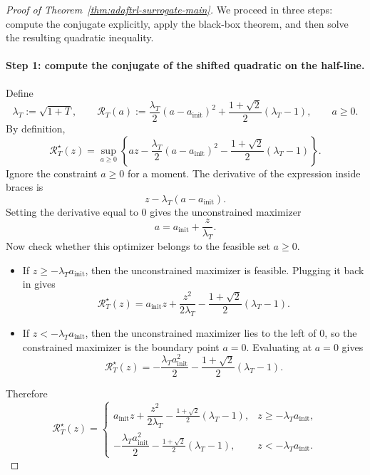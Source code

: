 \documentclass[11pt]{article}
\newcommand{\1}{\mathbf{1}}
\begin{document}
\begin{proof}[Proof of Theorem~\ref{thm:adaftrl-surrogate-main}]
We proceed in three steps: compute the conjugate explicitly, apply the black-box theorem, and then solve the resulting quadratic inequality.

\paragraph{Step 1: compute the conjugate of the shifted quadratic on the half-line.}
Define
\[
\lambda_T:=\sqrt{1+T},
\qquad
\mathcal R_T(a) := \frac{\lambda_T}{2}(a-a_{\mathrm{init}})^2 + \frac{1+\sqrt{2}}{2}(\lambda_T-1),
\qquad a\ge 0.
\]
By definition,
\[
\mathcal R_T^\star(z)=\sup_{a\ge 0}\left\{az-\frac{\lambda_T}{2}(a-a_{\mathrm{init}})^2-\frac{1+\sqrt{2}}{2}(\lambda_T-1)\right\}.
\]
Ignore the constraint $a\ge 0$ for a moment. The derivative of the expression inside braces is
\[
z-\lambda_T(a-a_{\mathrm{init}}).
\]
Setting the derivative equal to $0$ gives the unconstrained maximizer
\[
a=a_{\mathrm{init}}+\frac{z}{\lambda_T}.
\]
Now check whether this optimizer belongs to the feasible set $a\ge 0$.
\begin{itemize}[leftmargin=*]
\item If $z\ge -\lambda_T a_{\mathrm{init}}$, then the unconstrained maximizer is feasible. Plugging it back in gives
\[
\mathcal R_T^\star(z)=a_{\mathrm{init}}z+\frac{z^2}{2\lambda_T}-\frac{1+\sqrt{2}}{2}(\lambda_T-1).
\]
\item If $z< -\lambda_T a_{\mathrm{init}}$, then the unconstrained maximizer lies to the left of $0$, so the constrained maximizer is the boundary point $a=0$. Evaluating at $a=0$ gives
\[
\mathcal R_T^\star(z)=-\frac{\lambda_T a_{\mathrm{init}}^2}{2}-\frac{1+\sqrt{2}}{2}(\lambda_T-1).
\]
\end{itemize}
Therefore
\[
\mathcal R_T^\star(z)
=
\begin{cases}
a_{\mathrm{init}}z+\dfrac{z^2}{2\lambda_T}-\frac{1+\sqrt{2}}{2}(\lambda_T-1), & z\ge -\lambda_T a_{\mathrm{init}},\\[2ex]
-\dfrac{\lambda_T a_{\mathrm{init}}^2}{2}-\frac{1+\sqrt{2}}{2}(\lambda_T-1), & z<-\lambda_T a_{\mathrm{init}}.
\end{cases}
\]


\end{proof}
\end{document}
